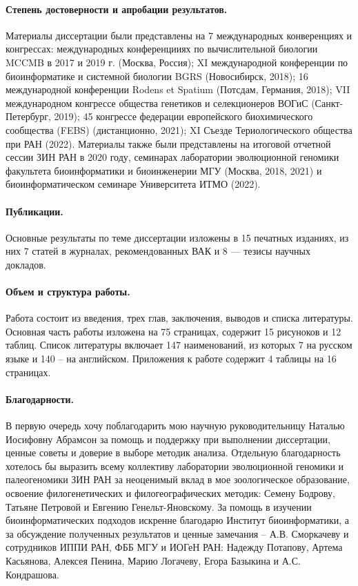 \paragraph{Степень достоверности и апробации результатов.} Материалы диссертации были представлены на 7 международных конверенциях и конгрессах: международных конференцииях по вычислительной биологии MCCMB в 2017 и 2019 г. (Москва, Россия); XI международной конференции по биоинформатике и системной биологии BGRS (Новосибирск, 2018); 16 международной конференции Rodens et Spatium (Потсдам, Германия, 2018); VII международном конгрессе общества генетиков и селекционеров ВОГиС (Санкт-Петербург, 2019); 45 конгрессе федерации европейского биохимического сообщества (FEBS) (дистанционно, 2021); XI Съезде Териологического общества при РАН (2022). Материалы также были представлены на итоговой отчетной сессии ЗИН РАН в 2020 году, семинарах лаборатории эволюционной геномики факультета биоинформатики и биоинженерии МГУ (Москва, 2018, 2021) и биоинформатическом семинаре Университета ИТМО (2022).

\paragraph{Публикации.} Основные результаты по теме диссертации изложены в 15 печатных изданиях, из них 7 статей в журналах, рекомендованных ВАК и 8 --- тезисы научных докладов.

\paragraph{Объем и структура работы.} Работа состоит из введения, трех глав, заключения, выводов и списка литературы. Основная часть работы изложена на 75 страницах, содержит 15 рисуноков и 12 таблиц. Список литературы включает 147 наименований, из которых 7 на русском языке и 140 -- на английском. Приложения к работе содержит 4 таблицы на 16 страницах.

\paragraph{Благодарности.}
В первую очередь хочу поблагодарить мою научную руководительницу Наталью Иосифовну Абрамсон за помощь и поддержку при выполнении диссертации, ценные советы и доверие в выборе методик анализа. Отдельную благодарность хотелось бы выразить всему коллективу лаборатории эволюционной геномики и палеогеномики ЗИН РАН за неоценимый вклад в мое зоологическое образование, освоение филогенетических и филогеографических методик: Семену Бодрову, Татьяне Петровой и Евгению Генельт-Яновскому. За помощь в изучении биоинформатических подходов искренне благодарю Институт биоинформатики, а за обсуждение полученных результатов и ценные замечания -- А.В. Сморкачеву и сотрудников ИППИ РАН, ФББ МГУ и ИОГеН РАН: Надежду Потапову, Артема Касьянова, Алексея Пенина, Марию Логачеву, Егора Базыкина и А.С. Кондрашова.   


